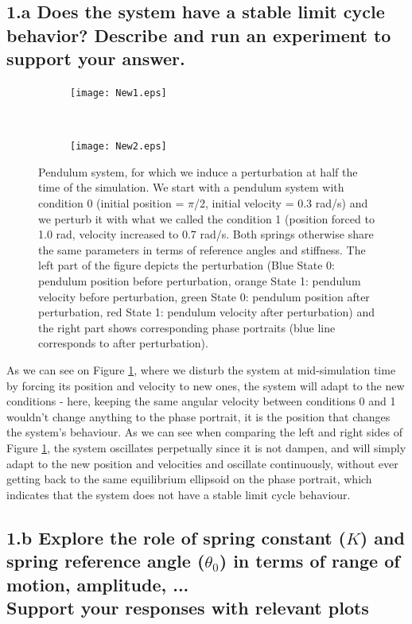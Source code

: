 \documentclass{cmc}
\begin{document}
\subsection*{1.a Does the system have a stable limit cycle behavior?
  Describe and run an experiment to support your answer.}
\label{subsec:1.a}

\begin{figure}[H]
    \centering
    \begin{subfigure}[b]{0.5\textwidth}
        \centering
        \texttt{[image: New1.eps]}
    \end{subfigure}%
    ~
    \begin{subfigure}[b]{0.5\textwidth}
        \centering
        \texttt{[image: New2.eps]}
    \end{subfigure}
    \caption{Pendulum system, for which we induce a perturbation at half the time of the simulation. We start with a pendulum system with condition 0 (initial position = $\pi$/2, initial velocity = 0.3 rad/s) and we perturb it with what we called the condition 1 (position forced to 1.0 rad, velocity increased to 0.7 rad/s. Both springs otherwise share the same parameters in terms of reference angles and stiffness. The left part of the figure depicts the perturbation (Blue State 0: pendulum position before perturbation, orange State 1: pendulum velocity before perturbation, green State 0: pendulum position after perturbation, red State 1: pendulum velocity after perturbation) and the right part shows corresponding phase portraits (blue line corresponds to after perturbation). }
    \label{figure:1a}
\end{figure}

As we can see on Figure \ref{figure:1a}, where we disturb the system at mid-simulation time by forcing its position and velocity to new ones, the system will adapt to the new conditions - here, keeping the same angular velocity between conditions 0 and 1 wouldn't change anything to the phase portrait, it is the position that changes the system's behaviour. As we can see when comparing the left and right sides of Figure \ref{figure:1a}, the system oscillates perpetually since it is not dampen, and will simply adapt to the new position and velocities and oscillate continuously, without ever getting back to the same equilibrium ellipsoid on the phase portrait, which indicates that the system does not have a stable limit cycle behaviour.

\subsection*{1.b Explore the role of spring constant ($K$) and spring
  reference angle ($\theta_0$) in terms of range of motion, amplitude,
  ... \\ Support your responses with relevant plots }
\end{document}
